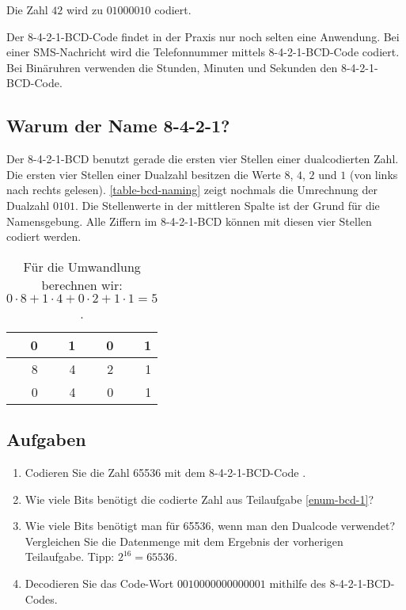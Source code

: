 \begin{example}
Die Zahl $42$ wird zu $01000010$ codiert.
\end{example}

Der 8-4-2-1-\ac{BCD}-Code findet in der Praxis nur noch selten eine Anwendung. Bei einer \ac{SMS}-Nachricht wird die Telefonnummer mittels 8-4-2-1-\ac{BCD}-Code codiert. Bei Binäruhren verwenden die Stunden, Minuten und Sekunden den 8-4-2-1-\ac{BCD}-Code.

\subsection{Warum der Name 8-4-2-1?}

\begin{table}[htb]
\begin{minipage}{0.65\textwidth}
Der 8-4-2-1-\ac{BCD} benutzt gerade die ersten vier Stellen einer dualcodierten Zahl. Die ersten vier Stellen einer Dualzahl besitzen die Werte $8$, $4$, $2$ und $1$ (von links nach rechts gelesen). \autoref{table-bcd-naming} zeigt nochmals die Umrechnung der Dualzahl $0101$. Die Stellenwerte in der mittleren Spalte ist der Grund für die Namensgebung. Alle Ziffern im 8-4-2-1-\ac{BCD} können mit diesen vier Stellen codiert werden.
\end{minipage}
\hfill
\begin{minipage}{0.3\textwidth}
\centering
\begin{tabular}{|r|r|r|r|}
\hline
0 & 1 & 0 & 1 \\ \hline
8 & 4 & 2 & 1 \\ \hline\hline
0 & 4 & 0 & 1 \\ \hline
\end{tabular}
\caption{Für die Umwandlung berechnen wir: $0 \cdot 8 + 1\cdot 4 + 0 \cdot 2 + 1 \cdot 1 = 5$.}
\label{table-bcd-naming}
\end{minipage}
\end{table}

\subsection{Aufgaben}
\label{subsection-bcd-8421-aufgaben}

\begin{enumerate}
\item Codieren Sie die Zahl \num{65536} mit dem 8-4-2-1-\ac{BCD}-Code \label{enum-bcd-1}.
\fillwithgrid{0.5in}
\item Wie viele Bits benötigt die codierte Zahl aus Teilaufgabe \ref{enum-bcd-1}?
\fillwithgrid{0.25in}
\item Wie viele Bits benötigt man für \num{65536}, wenn man den Dualcode verwendet? Vergleichen Sie die Datenmenge mit dem Ergebnis der vorherigen Teilaufgabe. Tipp: $2^{16} = \num{65536}$.
\fillwithgrid{0.5in}
\item Decodieren Sie das Code-Wort $0010000000000001$ mithilfe des 8-4-2-1-\ac{BCD}-Codes.
\fillwithgrid{0.25in}
\end{enumerate}

